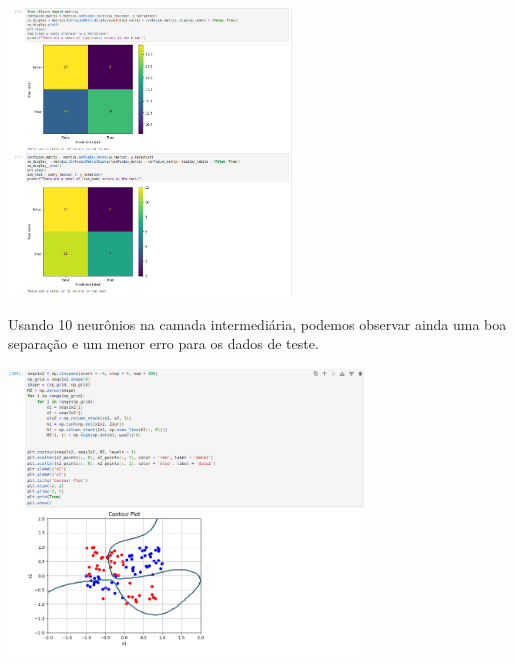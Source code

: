 \documentclass{article}
\begin{document}
\begin{center}

\includegraphics[height=3in]{exercise_pic/xor/conf_matrix_5_xor.png}
\vspace{10pt}
    
\end{center}
Usando 10 neurônios na camada intermediária, podemos observar ainda uma boa separação e um menor erro para os dados de teste.

\begin{center}

\includegraphics[height=3in]{exercise_pic/xor/plot_graph_xor_10.png}
\vspace{10pt}

\end{center}
\end{document}
